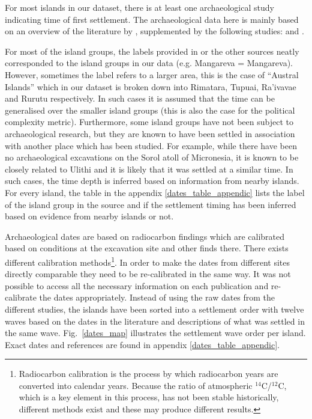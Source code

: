 \documentclass[12pt,letterpaper]{article}
\begin{document}
For most islands in our dataset, there is at least one archaeological study indicating time of first settlement. The archaeological data here is mainly based on an overview of the literature by \citet{rieth_cochrane_2018}, supplemented by the following studies: \citet{intoh2007reconnaissance, intoh2008ongoing, carson2012recent, kirch2012basline, Napolitano_et_al_yap, ellis2012saipan} and \citet{levin_seikel_miles_2019}. 

For most of the island groups, the labels provided in \citet{rieth_cochrane_2018} or the other sources neatly corresponded to the island groups in our data (e.g. Mangareva = Mangareva). However, sometimes the label refers to a larger area, this is the case of ``Austral Islands'' which in our dataset is broken down into Rimatara, Tupuai, Ra'ivavae and Rurutu respectively. In such cases it is assumed that the time can be generalised over the smaller island groups (this is also the case for the political complexity metric). Furthermore, some island groups have not been subject to archaeological research, but they are known to have been settled in association with another place which has been studied. For example, while there have been no archaeological excavations on the Sorol atoll of Micronesia, it is known to be closely related to Ulithi \citep[23]{quackenbush1968sonsorol} and it is likely that it was settled at a similar time. In such cases, the time depth is inferred based on information from nearby islands. For every island, the table in the appendix \ref{dates_table_appendic} lists the label of the island group in the source and if the settlement timing has been inferred based on evidence from nearby islands or not.

Archaeological dates are based on radiocarbon findings which are calibrated based on conditions at the excavation site and other finds there. There exists different calibration methods\footnote{Radiocarbon calibration is the process by which radiocarbon years are converted into calendar years. Because the ratio of atmospheric $^{14}$C/$^{12}$C, which is a key element in this process, has not been stable historically, different methods exist and these may produce different results.}. In order to make the dates from different sites directly comparable they need to be re-calibrated in the same way. It was not possible to access all the necessary information on each publication and re-calibrate the dates appropriately. Instead of using the raw dates from the different studies, the islands have been sorted into a settlement order with twelve waves based on the dates in the literature and descriptions of what was settled in the same wave. Fig.~\ref{dates_map} illustrates the settlement wave order per island. Exact dates and references are found in appendix \ref{dates_table_appendic}.
\end{document}
